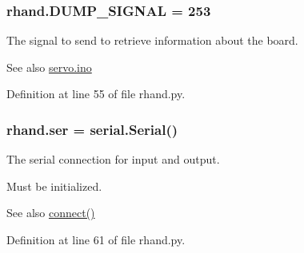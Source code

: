 \subsubsection[{D\+U\+M\+P\+\_\+\+S\+I\+G\+N\+A\+L}]{\setlength{\rightskip}{0pt plus 5cm}rhand.\+D\+U\+M\+P\+\_\+\+S\+I\+G\+N\+A\+L = 253}\label{namespacerhand_ad3b284028dfecade760db3a71725c916}


The signal to send to retrieve information about the board. 

\begin{DoxySeeAlso}{See also}
\hyperlink{servo_8ino}{servo.\+ino} 
\end{DoxySeeAlso}


Definition at line 55 of file rhand.\+py.

\hypertarget{namespacerhand_a55075d70ccd56b9f3addb4dec3331b32}{}
\subsubsection[{ser}]{\setlength{\rightskip}{0pt plus 5cm}rhand.\+ser = serial.\+Serial()}\label{namespacerhand_a55075d70ccd56b9f3addb4dec3331b32}


The serial connection for input and output. 

Must be initialized. \begin{DoxySeeAlso}{See also}
\hyperlink{namespacerhand_ab6cfbdf7ca3e2e337ab0c5f9ee95760f}{connect()} 
\end{DoxySeeAlso}


Definition at line 61 of file rhand.\+py.

